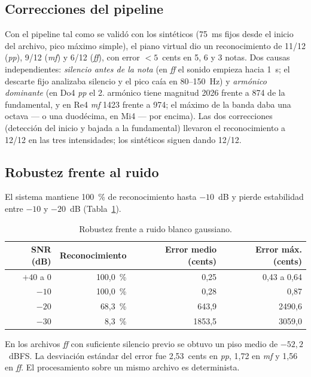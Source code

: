 \documentclass[12pt]{article}
\begin{document}
\subsection{Correcciones del pipeline}
Con el pipeline tal como se validó con los sintéticos (75~ms fijos desde el
inicio del archivo, pico máximo simple), el piano virtual dio un
reconocimiento de 11/12 (\emph{pp}), 9/12 (\emph{mf}) y 6/12 (\emph{ff}),
con error $<5$~cents en 5, 6 y 3 notas. Dos causas independientes:
\emph{silencio antes de la nota} (en \emph{ff} el sonido empieza hacia 1~s;
el descarte fijo analizaba silencio y el pico caía en 80--150~Hz) y
\emph{armónico dominante} (en Do4 \emph{pp} el 2.\textordmasculine{} armónico
tiene magnitud 2026 frente a 874 de la fundamental, y en Re4 \emph{mf} 1423
frente a 974; el máximo de la banda daba una octava --- o una duodécima,
en Mi4 --- por encima). Las dos correcciones (detección del inicio y
bajada a la fundamental) llevaron el reconocimiento a 12/12 en las tres
intensidades; los sintéticos siguen dando 12/12.

\subsection{Robustez frente al ruido}
\label{sec:ruido}
El sistema mantiene 100~\% de reconocimiento hasta $-10$~dB y pierde estabilidad entre
$-10$ y $-20$~dB (Tabla~\ref{tab:ruido}).

\begin{table}[ht]
  \centering
  \footnotesize
  \begin{tabular}{rrrr}
    \toprule
    \rowcolor{TableHead}
    SNR (dB) & Reconocimiento & Error medio (cents) & Error máx. (cents) \\
    \midrule
    $+40$ a $0$ & 100,0~\% & 0,25 & 0,43 a 0,64 \\
    $-10$ & 100,0~\% & 0,28 & 0,87 \\
    $-20$ &  68,3~\% & 643,9 & 2490,6 \\
    $-30$ &   8,3~\% & 1853,5 & 3059,0 \\
    \bottomrule
  \end{tabular}
  \caption{Robustez frente a ruido blanco gaussiano.}
  \label{tab:ruido}
\end{table}

En los archivos \emph{ff} con suficiente silencio previo se obtuvo un piso medio de
$-52{,}2$~dBFS. La desviación estándar del error fue 2,53~cents en \emph{pp},
1,72 en \emph{mf} y 1,56 en \emph{ff}. El procesamiento sobre un mismo archivo es
determinista.
\end{document}
